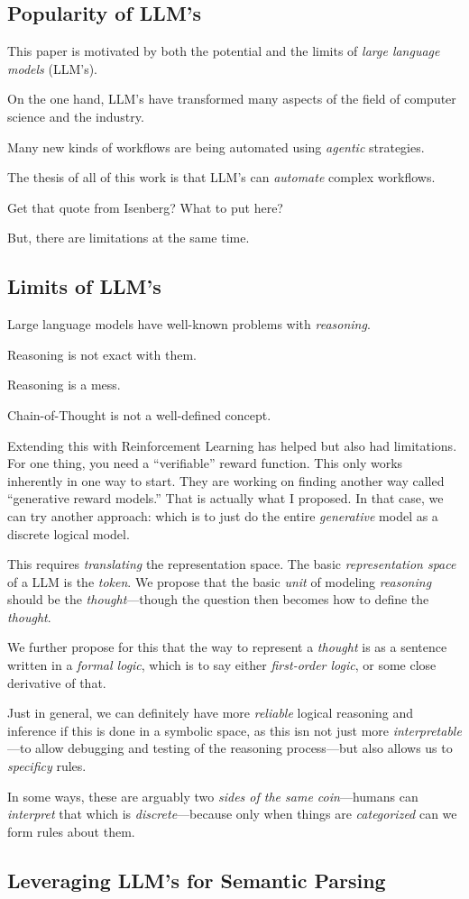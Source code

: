 \label{sec:contributions}
\subsection{Popularity of LLM's}
This paper is motivated by both the potential and the limits of {\em large language models} (LLM's).

On the one hand, LLM's have transformed many aspects of the field of computer science and the industry.

Many new kinds of workflows are being automated using {\em agentic} strategies.

The thesis of all of this work is that LLM's can {\em automate} complex workflows.

Get that quote from Isenberg? What to put here?

But, there are limitations at the same time.

\subsection{Limits of LLM's}
Large language models have well-known problems with {\em reasoning}.

Reasoning is not exact with them.

Reasoning is a mess.

Chain-of-Thought is not a well-defined concept.

Extending this with Reinforcement Learning has helped but also had limitations.
For one thing, you need a ``verifiable'' reward function.
This only works inherently in one way to start.
They are working on finding another way called ``generative reward models.''
That is actually what I proposed.
In that case, we can try another approach: which is to just do the entire {\em generative} model as a discrete logical model.

This requires {\em translating} the representation space.
The basic {\em representation space} of a LLM is the {\em token}.
We propose that the basic {\em unit} of modeling {\em reasoning} should be the {\em thought}---though the question then becomes how to define the {\em thought}.

We further propose for this that the way to represent a {\em thought} is as a sentence written in a {\em formal logic}, which is to say either {\em first-order logic}, or some close derivative of that.

Just in general, we can definitely have more {\em reliable} logical reasoning and inference if this is done in a symbolic space, as this isn not just more {\em interpretable}---to allow debugging and testing of the reasoning process---but also allows us to {\em specificy} rules.

In some ways, these are arguably two {\em sides of the same coin}---humans can {\em interpret} that which is {\em discrete}---because only when things are {\em categorized} can we form rules about them.

\subsection{Leveraging LLM's for Semantic Parsing}